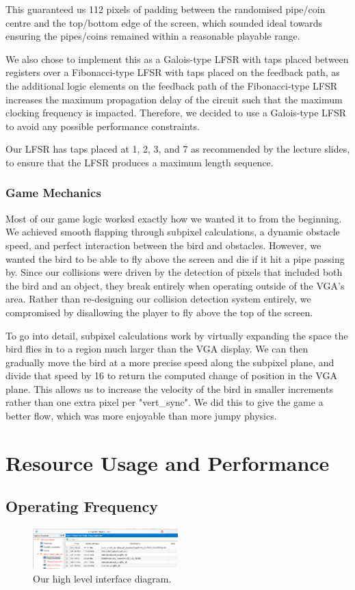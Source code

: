 \documentclass[conference]{IEEEtran}
\begin{document}
This guaranteed us 112 pixels of padding between the randomised pipe/coin centre and the top/bottom edge of the screen, which sounded ideal towards ensuring the pipes/coins remained within a reasonable playable range.

We also chose to implement this as a Galois-type LFSR with taps placed between registers over a Fibonacci-type LFSR with taps placed on the feedback path, as the additional logic elements on the feedback path of the Fibonacci-type LFSR increases the maximum propagation delay of the circuit such that the maximum clocking frequency is impacted. Therefore, we decided to use a Galois-type LFSR to avoid any possible performance constraints.

Our LFSR has taps placed at 1, 2, 3, and 7 as recommended by the lecture slides, to ensure that the LFSR produces a maximum length sequence.

\subsubsection{Game Mechanics}
Most of our game logic worked exactly how we wanted it to from the beginning. We achieved smooth flapping through subpixel calculations, a dynamic obstacle speed, and perfect interaction between the bird and obstacles. However, we wanted the bird to be able to fly above the screen and die if it hit a pipe passing by. Since our collisions were driven by the detection of pixels that included both the bird and an object, they break entirely when operating outside of the VGA's area. Rather than re-designing our collision detection system entirely, we compromised by disallowing the player to fly above the top of the screen.

To go into detail, subpixel calculations work by virtually expanding the space the bird flies in to a region much larger than the VGA display. We can then gradually move the bird at a more precise speed along the subpixel plane, and divide that speed by 16 to return the computed change of position in the VGA plane. This allows us to increase the velocity of the bird in smaller increments rather than one extra pixel per "vert\_sync". We did this to give the game a better flow, which was more enjoyable than more jumpy physics.

\section{Resource Usage and Performance}
\subsection{Operating Frequency}
\begin{figure}[htbp]
    \centerline{\includegraphics[width=0.5\textwidth]{max-frequency.png}}
    \caption{Our high level interface diagram.}
    \label{fig:max-frequency}
\end{figure}
\end{document}

